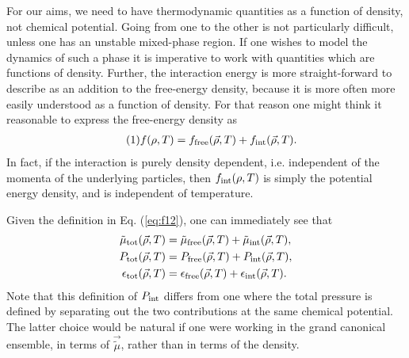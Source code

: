 \documentclass[12pt]{article}
\numberwithin{equation}{section}
\numberwithin{figure}{section}
\newcommand\eqnumber{\addtocounter{equation}{1}\tag{\theequation}}
\begin{document}
For our aims, we need to have thermodynamic quantities as a function of density, not chemical potential. Going from one to the other is not particularly difficult, unless one has an unstable mixed-phase region. If one wishes to model the dynamics of such a phase it is imperative to work with quantities which are functions of density. Further, the interaction energy is more straight-forward to describe as an addition to the free-energy density, because it is more often more easily understood as a function of density. For that reason one might think it reasonable to express the free-energy density as
\begin{align*}\eqnumber
f(\rho,T)&=f_{\rm free}(\vec{\rho},T)+f_{\rm int}(\vec{\rho},T).
\end{align*}
In fact, if the interaction is purely density dependent, i.e. independent of the momenta of the underlying particles, then $f_{\rm int}(\rho,T)$ is simply the potential energy density, and is independent of temperature.

Given the definition in Eq. (\ref{eq:f12}), one can immediately see that
\begin{align*}
\tilde{\mu}_{\rm tot}(\vec{\rho},T)&=\tilde{\mu}_{\rm free}(\vec{\rho},T)+\tilde{\mu}_{\rm int}(\vec{\rho},T),\\
P_{\rm tot}(\vec{\rho},T)&=P_{\rm free}(\vec{\rho},T)+P_{\rm int}(\vec{\rho},T),\\
\epsilon_{\rm tot}(\vec{\rho},T)&=\epsilon_{\rm free}(\vec{\rho},T)+\epsilon_{\rm int}(\vec{\rho},T).
\end{align*}
Note that this definition of $P_{\rm int}$ differs from one where the total pressure is defined by separating out the two contributions at the same chemical potential. The latter choice would be natural if one were working in the grand canonical ensemble, in terms of $\vec{\tilde{\mu}}$, rather than in terms of the density.
\end{document}

